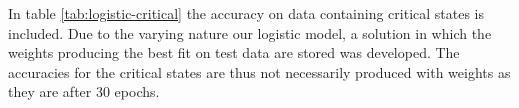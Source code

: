 In table \ref{tab:logistic-critical} the accuracy on data containing critical states
is included. Due to the varying nature our logistic model, a solution in which the weights
producing the best fit on test data are stored was developed. The accuracies for the critical
states are thus not necessarily produced with weights as they are after 30 epochs.


